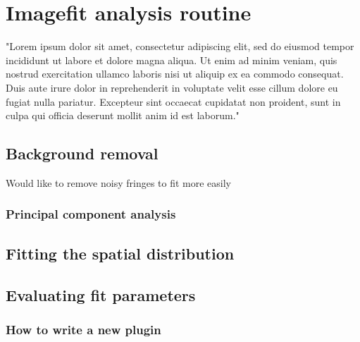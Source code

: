 \chapter{Imagefit analysis routine}
"Lorem ipsum dolor sit amet, consectetur adipiscing elit, sed do eiusmod tempor incididunt ut labore et dolore magna aliqua. Ut enim ad minim veniam, quis nostrud exercitation ullamco laboris nisi ut aliquip ex ea commodo consequat. Duis aute irure dolor in reprehenderit in voluptate velit esse cillum dolore eu fugiat nulla pariatur. Excepteur sint occaecat cupidatat non proident, sunt in culpa qui officia deserunt mollit anim id est laborum."

\section{Background removal}
Would like to remove noisy fringes to fit more easily

\subsection{Principal component analysis}

\section{Fitting the spatial distribution}

\section{Evaluating fit parameters}
\subsection{How to write a new plugin}